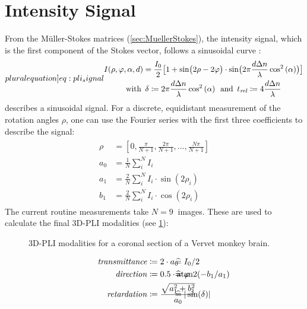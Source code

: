 \section{Intensity Signal}\label{sec::intSignal}
%
From the M{\"u}ller-Stokes matrices (\cref{sec:MuellerStokes}), the intensity signal, which is the first component of the Stokes vector, follows a sinusoidal curve \cite{MenzelMaster,MenzelDissertation}:
%
\begin{align}
\label[pluralequation]{eq:pli_signal}
\centering
\begin{gathered}
I(\rho, \varphi, \alpha, d) =\frac{I_0}{2}\bigl[ 1+ \sin\bigl(2\rho - 2\varphi \bigr)\cdot \sin \bigl( 2\pi\frac{d \dn}{\lambda} \cos^2\left( \alpha \right) \bigr) \bigr] \\
\text{with} \enspace \delta \coloneqq 2\pi\frac{d \dn}{\lambda} \cos^2\left( \alpha \right) \enspace
\text{and} \enspace \trel \coloneqq 4 \frac{d \dn}{\lambda}
\end{gathered}
\end{align}
%
 describes a sinusoidal signal.
For a discrete, equidistant measurement of the rotation angles $\rho$, one can use the Fourier series with the first three coefficients to describe the signal:
%
\begin{align}
\begin{split}
\rho &= [0, \frac{\pi}{N+1}, \frac{2\pi}{N+1}, ..., \frac{N\pi}{N+1}]\\
a_0 &= \frac{1}{N} \sum_i^N I_i\\
a_1 &= \frac{2}{N} \sum_i^N I_i \cdot \sin(2 \rho_i)\\
b_1 &= \frac{2}{N} \sum_i^N I_i \cdot \cos(2 \rho_i)
\end{split}
\end{align}
%
The current routine measurements take $N=\SI{9}{}$ images.
These are used to calculate the final \ac{3D-PLI} modalities (see \cref{fig:vervetpli}):
%
\begin{figure}[!t]

\caption[3D-PLI modalities]{3D-PLI modalities for a coronal section of a Vervet monkey brain.}
\label{fig:vervetpli}
\end{figure}
%
\begin{align}
\begin{split}
\mathit{transmittance} &\coloneqq 2 \cdot a_0 \vphantom{I_0/2} \\
\mathit{direction} &\coloneqq 0.5 \cdot \atantwo(-b_1 / a_1) \vphantom{\varphi} \\
\mathit{retardation} &\coloneqq \frac{\sqrt{a_1^2 + b_1^2}}{a_0}  \vphantom{\sin(\delta)}
\end{split}
\hspace{-7em}
\begin{split}
& \mathrel{\widehat{=}} I_0/2 \vphantom{2 \cdot a_0}\\
& \mathrel{\widehat{=}} \varphi \vphantom{0.5 \cdot \atantwo(-b_1 / a_1)} \\
& \mathrel{\widehat{=}} |\sin(\delta)| \vphantom{\frac{\sqrt{a_1^2 + b_1^2}}{a_0}}
\end{split}
\end{align}
